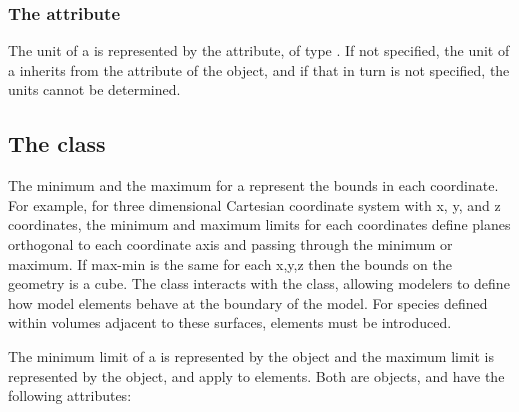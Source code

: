 

\subsubsection{The \fixttspace{} attribute}
The unit of a \CoordinateComponent is represented by the  attribute, of type .  If not specified, the unit of a \CoordinateComponent inherits from the  attribute of the \Model object, and if that in turn is not specified, the \CoordinateComponent units cannot be determined.


\subsection{The  class}
\label{boundary-class}
The minimum and the maximum for a \CoordinateComponent represent the bounds in each coordinate.  For example, for three dimensional Cartesian coordinate system with x, y, and z coordinates, the minimum and maximum limits for each coordinates define planes orthogonal to each coordinate axis and passing through the minimum or maximum.  If max-min is the same for each x,y,z then the bounds on the geometry is a cube.  The \Boundary class interacts with the \BoundaryCondition class, allowing modelers to define how model elements behave at the boundary of the model.  For species defined within volumes adjacent to these surfaces, \BoundaryCondition elements must be introduced.


The minimum limit of a \CoordinateComponent is represented by the  object and the maximum limit is represented by the  object, and apply to \CoordinateComponent elements.
Both are \Boundary objects, and have the following attributes:

